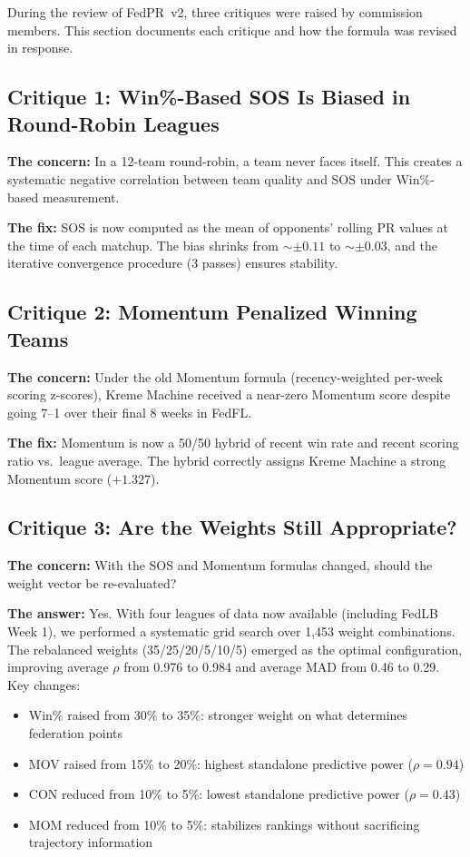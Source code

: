 \documentclass[11pt,a4paper]{article}
\begin{document}
During the review of FedPR~v2, three critiques were raised by commission members. This section documents each critique and how the formula was revised in response.

\subsection{Critique 1: Win\%-Based SOS Is Biased in Round-Robin Leagues}

\textbf{The concern:} In a 12-team round-robin, a team never faces itself. This creates a systematic negative correlation between team quality and SOS under Win\%-based measurement.

\textbf{The fix:} SOS is now computed as the mean of opponents' rolling PR values at the time of each matchup. The bias shrinks from $\sim\pm 0.11$ to $\sim\pm 0.03$, and the iterative convergence procedure (3 passes) ensures stability.

\subsection{Critique 2: Momentum Penalized Winning Teams}

\textbf{The concern:} Under the old Momentum formula (recency-weighted per-week scoring z-scores), Kreme Machine received a near-zero Momentum score despite going 7--1 over their final 8 weeks in FedFL.

\textbf{The fix:} Momentum is now a 50/50 hybrid of recent win rate and recent scoring ratio vs.\ league average. The hybrid correctly assigns Kreme Machine a strong Momentum score ($+1.327$).

\subsection{Critique 3: Are the Weights Still Appropriate?}

\textbf{The concern:} With the SOS and Momentum formulas changed, should the weight vector be re-evaluated?

\textbf{The answer:} Yes. With four leagues of data now available (including FedLB Week 1), we performed a systematic grid search over 1,453 weight combinations. The rebalanced weights (35/25/20/5/10/5) emerged as the optimal configuration, improving average $\rho$ from 0.976 to 0.984 and average MAD from 0.46 to 0.29. Key changes:

\begin{itemize}[nosep]
\item Win\% raised from 30\% to 35\%: stronger weight on what determines federation points
\item MOV raised from 15\% to 20\%: highest standalone predictive power ($\rho = 0.94$)
\item CON reduced from 10\% to 5\%: lowest standalone predictive power ($\rho = 0.43$)
\item MOM reduced from 10\% to 5\%: stabilizes rankings without sacrificing trajectory information
\end{itemize}
\end{document}
